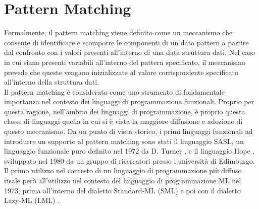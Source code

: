 \section{Pattern Matching}
\label{pattern-matching}


Formalmente, il pattern matching viene definito come un meccanismo che consente
di identificare e scomporre le componenti di un dato pattern a partire dal
confronto con i valori presenti all’interno di una data struttura dati. Nel caso
in cui siano presenti variabili all’interno del pattern specificato, il
meccanismo prevede che queste vengano inizializzate al valore corrispondente
specificato all’interno della struttura dati.\\

Il pattern matching è considerato come uno strumento di fondamentale importanza
nel contesto dei linguaggi di programmazione funzionali. Proprio per questa
ragione, nell’ambito dei linguaggi di programmazione, è proprio questa classe di
linguaggi quella in cui si è vista la maggiore diffusione e adozione di questo
meccanismo. Da un punto di vista storico, i primi linguaggi funzionali ad
introdurre un supporto al pattern matching sono stati il linguaggio SASL, un
linguaggio funzionale puro definito nel 1972 da D. Turner
\cite{DBLP:journals/spe/Turner79}, e il linguaggio Hope
\cite{DBLP:conf/lfp/BurstallMS80}, sviluppato nel 1980 da un gruppo di
ricercatori presso l'università di Edimburgo. Il primo utilizzo nel contesto di
un linguaggio di programmazione più diffuso risale però all’utilizzo nel
contesto del linguaggio di programmazione ML nel 1973, prima all’interno del
dialetto Standard-ML (SML) \cite{milner1997definition} e poi con il dialetto
Lazy-ML (LML) \cite{DBLP:conf/lfp/Augustsson84}.\\

